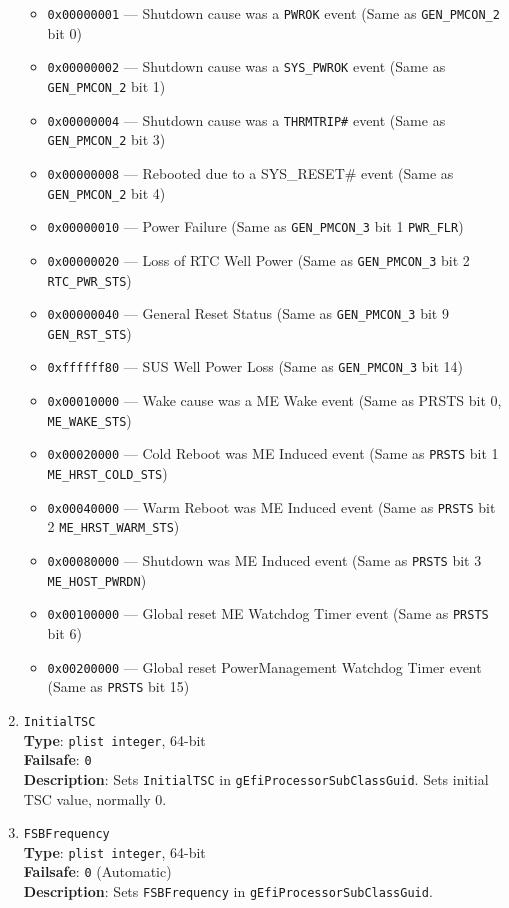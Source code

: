 \documentclass[]{article}
\providecommand{\tightlist}{%
  \setlength{\itemsep}{0pt}\setlength{\parskip}{0pt}}
\begin{document}
\begin{enumerate}
  \begin{itemize}
  \tightlist
  \item
    \texttt{0x00000001} --- Shutdown cause was a \texttt{PWROK} event
    (Same as \texttt{GEN\_PMCON\_2} bit 0)
  \item
    \texttt{0x00000002} --- Shutdown cause was a \texttt{SYS\_PWROK}
    event (Same as \texttt{GEN\_PMCON\_2} bit 1)
  \item
    \texttt{0x00000004} --- Shutdown cause was a \texttt{THRMTRIP\#}
    event (Same as \texttt{GEN\_PMCON\_2} bit 3)
  \item
    \texttt{0x00000008} --- Rebooted due to a SYS\_RESET\# event (Same
    as \texttt{GEN\_PMCON\_2} bit 4)
  \item
    \texttt{0x00000010} --- Power Failure (Same as
    \texttt{GEN\_PMCON\_3} bit 1 \texttt{PWR\_FLR})
  \item
    \texttt{0x00000020} --- Loss of RTC Well Power (Same as
    \texttt{GEN\_PMCON\_3} bit 2 \texttt{RTC\_PWR\_STS})
  \item
    \texttt{0x00000040} --- General Reset Status (Same as
    \texttt{GEN\_PMCON\_3} bit 9 \texttt{GEN\_RST\_STS})
  \item
    \texttt{0xffffff80} --- SUS Well Power Loss (Same as
    \texttt{GEN\_PMCON\_3} bit 14)
  \item
    \texttt{0x00010000} --- Wake cause was a ME Wake event (Same as
    PRSTS bit 0, \texttt{ME\_WAKE\_STS})
  \item
    \texttt{0x00020000} --- Cold Reboot was ME Induced event (Same as
    \texttt{PRSTS} bit 1 \texttt{ME\_HRST\_COLD\_STS})
  \item
    \texttt{0x00040000} --- Warm Reboot was ME Induced event (Same as
    \texttt{PRSTS} bit 2 \texttt{ME\_HRST\_WARM\_STS})
  \item
    \texttt{0x00080000} --- Shutdown was ME Induced event (Same as
    \texttt{PRSTS} bit 3 \texttt{ME\_HOST\_PWRDN})
  \item
    \texttt{0x00100000} --- Global reset ME Watchdog Timer event (Same as
    \texttt{PRSTS} bit 6)
  \item
    \texttt{0x00200000} --- Global reset PowerManagement Watchdog Timer
    event (Same as \texttt{PRSTS} bit 15)
  \end{itemize}
\item
  \texttt{InitialTSC}\\
  \textbf{Type}: \texttt{plist\ integer}, 64-bit\\
  \textbf{Failsafe}: \texttt{0}\\
  \textbf{Description}: Sets \texttt{InitialTSC} in
  \texttt{gEfiProcessorSubClassGuid}. Sets initial TSC value, normally 0.
\item
  \texttt{FSBFrequency}\\
  \textbf{Type}: \texttt{plist\ integer}, 64-bit\\
  \textbf{Failsafe}: \texttt{0} (Automatic)\\
  \textbf{Description}: Sets \texttt{FSBFrequency} in
  \texttt{gEfiProcessorSubClassGuid}.


\end{enumerate}
\end{document}
